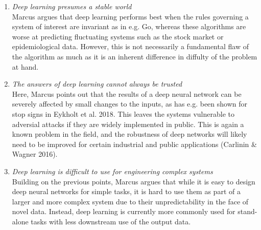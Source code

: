 \documentclass{article}
\begin{document}
\begin{enumerate}[1]
\item \textit{Deep learning presumes a stable world}\\
Marcus argues that deep learning performs best when the rules governing a system of interest are invariant as in e.g. Go, whereas these algorithms are worse at predicting fluctuating systems such as the stock market or epidemiological data. However, this is not necessarily a fundamental flaw of the algorithm as much as it is an inherent difference in diffulty of the problem at hand.

\item \textit{The answers of deep learning cannot always be trusted}\\
Here, Marcus points out that the results of a deep neural network can be severely affected by small changes to the inputs, as has e.g. been shown for stop signs in Eykholt et al. 2018. This leaves the systems vulnerable to adversial attacks if they are widely implemented in public. This is again a known problem in the field, and the robustness of deep networks will likely need to be improved for certain industrial and public applications (Carlinin \& Wagner 2016).

\item \textit{Deep learning is difficult to use for engineering complex systems}\\
Building on the previous points, Marcus argues that while it is easy to design deep neural networks for simple tasks, it is hard to use them as part of a larger and more complex system due to their unpredictability in the face of novel data. Instead, deep learning is currently more commonly used for stand-alone tasks with less downstream use of the output data.
\end{enumerate}
\end{document}
